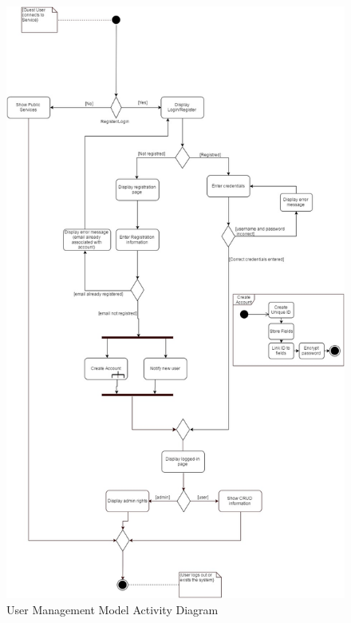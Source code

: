 \documentclass{article}
\begin{document}
      
      		\begin{figure}[H]
                    \centering \includegraphics[height=0.85\textheight]{UMM-Diagrams/UMM-ActivityDiagram}
                     \caption{User Management Model Activity Diagram}
					 \label{fig:user_activity}
			    \end{figure}
\end{document}
